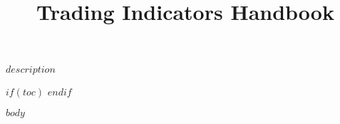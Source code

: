 \documentclass{article}
\title{Trading Indicators Handbook}
\begin{document}
    \begin{center}
        \maketitle
        \large $description$
    \end{center}

    \clearpage
    $if(toc)$
        \tableofcontents
        \newpage
    $endif$

    \clearpage
    $body$
\end{document}
